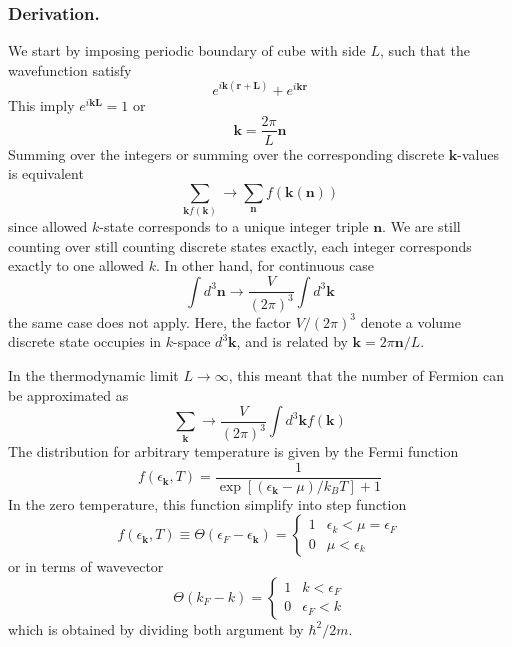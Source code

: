 \documentclass[../../../main.tex]{subfiles}
\begin{document}
\subsubsection{Derivation.}
We start by imposing periodic boundary of cube with side $L$, such that the wavefunction satisfy
\begin{equation*}
  e ^{i \mathbf{k }(\mathbf{r }+\mathbf{L })}
  +e ^{i \mathbf{k }\mathbf{r }}
\end{equation*}
This imply $  e ^{i \mathbf{k } \mathbf{L }}=1$ or
\begin{equation*}
  \mathbf{k }=\frac{2\pi }{L }\mathbf{n}
\end{equation*}
Summing over the integers or summing over the corresponding discrete $\mathbf{k}$-values is equivalent
\begin{equation*}
  \sum_{\mathbf{k }f(\mathbf{k } )} \to
  \sum_{\mathbf{n}}f(\mathbf{k }(\mathbf{n} ))
\end{equation*}
since allowed $k$-state corresponds to a unique integer triple $\mathbf{n}$.
We are still counting over still counting discrete states exactly, each integer corresponds exactly to one allowed $k$.
In other hand, for continuous case
\begin{equation*}
  \int d^3 \mathbf{n }\to
  \frac{V }{(2\pi)^3}\int d^3 \mathbf{k}
\end{equation*}
the same case does not apply.
Here, the factor $V/(2\pi)^3$ denote a volume discrete state occupies in $k$-space  $d^3\mathbf{k}$, and is related by $  \mathbf{k }=2\pi\mathbf{n}/L$.

In the thermodynamic limit $L \rightarrow \infty$, this meant that the number of Fermion can be approximated as
\begin{equation*}
  \sum_{\mathbf{k }} \to
  \frac{V }{(2\pi)^3} \int d^3 \mathbf{k} f(\mathbf{k } )
\end{equation*}
The distribution for arbitrary temperature is given by the Fermi function
\begin{equation*}
  f(\epsilon_\mathbf{k},T)=\frac{1}{\exp\left[(\epsilon_\mathbf{k}-\mu)/k_BT\right]+1}
\end{equation*}
In the zero temperature, this function simplify into step function
\begin{equation*}
  f(\epsilon_\mathbf{k},T) \equiv\Theta(\epsilon_F-\epsilon_\mathbf{k}) =
  \begin{cases}
    1 & \epsilon_k<\mu=\epsilon_F \\
    0 & \mu<\epsilon_k
  \end{cases}
\end{equation*}
or in terms of wavevector
\begin{equation*}
  \Theta(k_F-k) =
  \begin{cases}
    1 & k<\epsilon_F \\
    0 & \epsilon_F<k
  \end{cases}
\end{equation*}
which is obtained by dividing both argument by $\hbar ^2/2m$.
\end{document}
